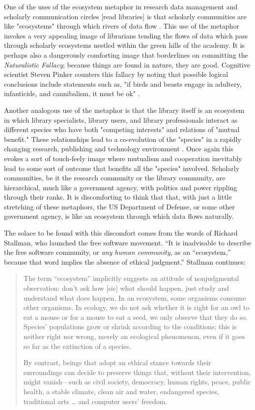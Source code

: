 One of the uses of the ecosystem metaphor in research data management and scholarly communication circles [read libraries] is that scholarly communities are like "ecosystems" through which rivers of data flow \citep{choudhury_2010}. This use of the metaphor invokes a very appealing image of librarians tending the flows of data which pass through scholarly ecosystems nestled within the green hills of the academy. It is perhaps also a dangerously comforting image that borderlines on committing the \textit{Naturalistic Fallacy}; because things are found in nature, they are good. Cognitive scientist Steven Pinker counters this fallacy by noting that possible logical conclusions include statements such as, "if birds and beasts engage in adultery, infanticide, and cannibalism, it must be ok" \citep{pinker_2002}. 

Another analogous use of the metaphor is that the library itself is an ecosystem in which library specialists, library users, and library professionals interact as different species who have both "competing interests" and relations of "mutual benefit." These relationships lead to a co-evolution of the "species" in a rapidly changing research, publishing and technology environment \citep{walter_2008}. Once again this evokes a sort of touch-feely image where mutualism and cooperation inevitably lead to some sort of outcome that benefits all the "species" involved. Scholarly communities, be it the research community or the library community, are hierarchical, much like a government agency, with politics and power rippling through their ranks. It is discomforting to think that that, with just a little stretching of these metaphors, the US Department of Defense, or some other government agency, is like an ecosystem through which data flows naturally. 

The solace to be found with this discomfort comes from the words of Richard Stallman, who launched the free software movement. “It is inadvisable to describe the free software community, or \textit{any human community}, as an “ecosystem,” because that word implies the absence of ethical judgment.”  Stallman continues:
 
\begin{quote}
The term “ecosystem” implicitly suggests an attitude of nonjudgmental observation: don't ask how [sic] what should happen, just study and understand what does happen. In an ecosystem, some organisms consume other organisms. In ecology, we do not ask whether it is right for an owl to eat a mouse or for a mouse to eat a seed, we only observe that they do so. Species' populations grow or shrink according to the conditions; this is neither right nor wrong, merely an ecological phenomenon, even if it goes so far as the extinction of a species.

By contrast, beings that adopt an ethical stance towards their surroundings can decide to preserve things that, without their intervention, might vanish—such as civil society, democracy, human rights, peace, public health, a stable climate, clean air and water, endangered species, traditional arts … and computer users' freedom. \citep{fsf_2014}
\end{quote}

